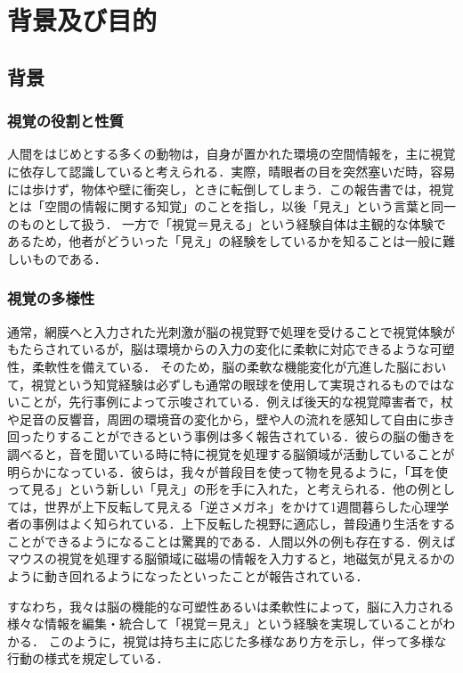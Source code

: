 \section{背景及び目的}
\subsection{背景}
\subsubsection{視覚の役割と性質}
人間をはじめとする多くの動物は，自身が置かれた環境の空間情報を，主に視覚に依存して認識していると考えられる．実際，晴眼者の目を突然塞いだ時，容易には歩けず，物体や壁に衝突し，ときに転倒してしまう．この報告書では，視覚とは「空間の情報に関する知覚」のことを指し，以後「見え」という言葉と同一のものとして扱う．
一方で「視覚＝見える」という経験自体は主観的な体験であるため，他者がどういった「見え」の経験をしているかを知ることは一般に難しいものである．

\subsubsection{視覚の多様性}
通常，網膜へと入力された光刺激が脳の視覚野で処理を受けることで視覚体験がもたらされているが，脳は環境からの入力の変化に柔軟に対応できるような可塑性，柔軟性を備えている．
そのため，脳の柔軟な機能変化が亢進した脳において，視覚という知覚経験は必ずしも通常の眼球を使用して実現されるものではないことが，先行事例によって示唆されている．例えば後天的な視覚障害者で，杖や足音の反響音，周囲の環境音の変化から，壁や人の流れを感知して自由に歩き回ったりすることができるという事例は多く報告されている．彼らの脳の働きを調べると，音を聞いている時に特に視覚を処理する脳領域が活動していることが明らかになっている．彼らは，我々が普段目を使って物を見るように，「耳を使って見る」という新しい「見え」の形を手に入れた，と考えられる．他の例としては，世界が上下反転して見える「逆さメガネ」をかけて1週間暮らした心理学者の事例はよく知られている．上下反転した視野に適応し，普段通り生活をすることができるようになることは驚異的である．人間以外の例も存在する．例えばマウスの視覚を処理する脳領域に磁場の情報を入力すると，地磁気が見えるかのように動き回れるようになったといったことが報告されている．

すなわち，我々は脳の機能的な可塑性あるいは柔軟性によって，脳に入力される様々な情報を編集・統合して「視覚＝見え」という経験を実現していることがわかる．
このように，視覚は持ち主に応じた多様なあり方を示し，伴って多様な行動の様式を規定している．

